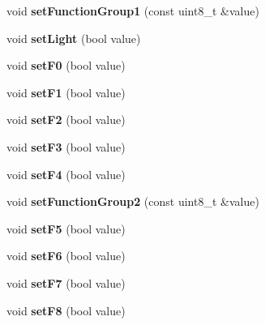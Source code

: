 \begin{DoxyCompactItemize}
void {\bfseries set\+Function\+Group1} (const uint8\+\_\+t \&value)
\item 
\mbox{\label{classTBT_1_1LocDecoder_a71807a8bab2731cc511659f118ecb01a}} 
void {\bfseries set\+Light} (bool value)
\item 
\mbox{\label{classTBT_1_1LocDecoder_ae7dc2a2221ba08ecaf34f50636f59b54}} 
void {\bfseries set\+F0} (bool value)
\item 
\mbox{\label{classTBT_1_1LocDecoder_aba76c6a9b002224297ba04ded570eee4}} 
void {\bfseries set\+F1} (bool value)
\item 
\mbox{\label{classTBT_1_1LocDecoder_a60e4822d5d730abec02cf045353d5316}} 
void {\bfseries set\+F2} (bool value)
\item 
\mbox{\label{classTBT_1_1LocDecoder_a6316b9510a9f3552dae834bb6c3deebc}} 
void {\bfseries set\+F3} (bool value)
\item 
\mbox{\label{classTBT_1_1LocDecoder_ae37228489df216238a51e1a22c37d66c}} 
void {\bfseries set\+F4} (bool value)
\item 
\mbox{\label{classTBT_1_1LocDecoder_af021433df427aac432590da7be6393a8}} 
void {\bfseries set\+Function\+Group2} (const uint8\+\_\+t \&value)
\item 
\mbox{\label{classTBT_1_1LocDecoder_a4e548e580a6ec3c93369af591281e00f}} 
void {\bfseries set\+F5} (bool value)
\item 
\mbox{\label{classTBT_1_1LocDecoder_af971c14a9437b240d17ab4ca9ffb3e67}} 
void {\bfseries set\+F6} (bool value)
\item 
\mbox{\label{classTBT_1_1LocDecoder_a16a3659cd9a64be4b6ef43b499004434}} 
void {\bfseries set\+F7} (bool value)
\item 
\mbox{\label{classTBT_1_1LocDecoder_a6a65d02e101d91142ce48587c9c905cf}} 
void {\bfseries set\+F8} (bool value)

\end{DoxyCompactItemize}
